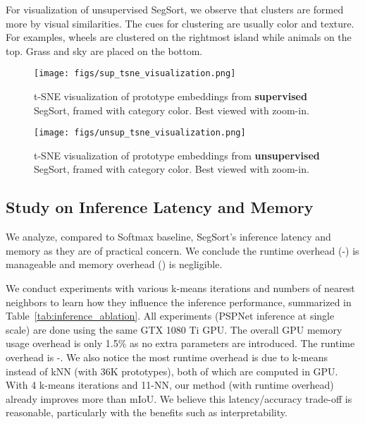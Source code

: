 \documentclass[10pt,twocolumn,letterpaper]{article}
\begin{document}
For visualization of unsupervised SegSort, we observe that clusters are formed more by visual similarities. The cues for clustering are usually color and texture. For examples, wheels are clustered on the rightmost island while animals on the top. Grass and sky are placed on the bottom.



\begin{figure*}
    \centering
    \texttt{[image: figs/sup\_tsne\_visualization.png]}
    \caption{t-SNE visualization of prototype embeddings from {\bf supervised} SegSort, framed with category color. Best viewed with zoom-in.}
    \label{fig:sup_tsne_visualization}
\end{figure*}

\begin{figure*}
    \centering
    \texttt{[image: figs/unsup\_tsne\_visualization.png]}
    \caption{t-SNE visualization of prototype embeddings from {\bf unsupervised} SegSort, framed with category color. Best viewed with zoom-in.}
    \label{fig:unsup_tsne_visualization}
\end{figure*}



\subsection{Study on Inference Latency and Memory}

We analyze, compared to Softmax baseline, SegSort's inference latency and memory as they are of practical concern. We conclude the runtime overhead (-) is manageable and memory overhead () is negligible.

We conduct experiments with various k-means iterations and numbers of nearest neighbors to learn how they influence the inference performance, summarized in Table~\ref{tab:inference_ablation}. All experiments (PSPNet inference at single scale) are done using the same GTX 1080 Ti GPU. The overall GPU memory usage overhead is only 1.5\% as no extra parameters are introduced. The runtime overhead is -. We also notice the most runtime overhead is due to k-means instead of kNN (with 36K prototypes), both of which are computed in GPU. With 4 k-means iterations and 11-NN, our method (with  runtime overhead) already improves more than  mIoU. We believe this  latency/accuracy trade-off is reasonable, particularly with the benefits such as interpretability.
\end{document}
